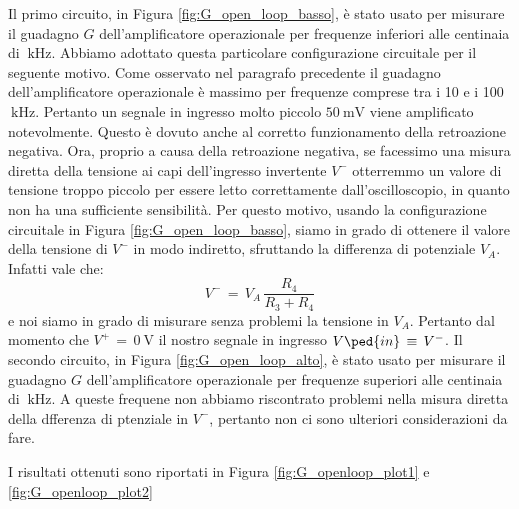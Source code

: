 Il primo circuito, in Figura \ref{fig:G_open_loop_basso}, è stato usato per misurare il guadagno $G$ dell'amplificatore operazionale per frequenze inferiori alle centinaia di $\SI{}{\kilo\hertz}$. Abbiamo adottato questa particolare configurazione circuitale per il seguente motivo. Come osservato nel paragrafo precedente il guadagno dell'amplificatore operazionale è massimo per frequenze comprese tra i 10 e i 100  $\SI{}{\kilo\hertz}$. Pertanto un segnale in ingresso molto piccolo $\SI{50}{\milli\volt}$ viene amplificato notevolmente. Questo è dovuto anche al corretto funzionamento della retroazione negativa. Ora, proprio a causa della retroazione negativa, se facessimo una misura diretta della tensione ai capi dell'ingresso invertente $V^-$ otterremmo un valore di tensione troppo piccolo per essere letto correttamente dall'oscilloscopio, in quanto non ha una sufficiente sensibilità. Per questo motivo, usando la configurazione circuitale in Figura \ref{fig:G_open_loop_basso}, siamo in grado di ottenere il valore della tensione di $V^-$ in modo indiretto, sfruttando la differenza di potenziale $V_A$. Infatti vale che:
\begin{equation*}
        V^-\,=\,V_A\,\frac{R_4}{R_3+R_4}
\end{equation*}
e noi siamo in grado di misurare senza problemi la tensione in $V_A$. Pertanto dal momento che $V^+\,=\,\SI{0}{\volt}$ il nostro segnale in ingresso $V\ped{in}\,\equiv\,V^-$.
Il secondo circuito, in Figura \ref{fig:G_open_loop_alto}, è stato usato per misurare il guadagno $G$ dell'amplificatore operazionale per frequenze superiori alle centinaia di $\SI{}{\kilo\hertz}$. A queste frequene non abbiamo riscontrato problemi nella misura diretta della dfferenza di ptenziale in $V^-$, pertanto non ci sono ulteriori considerazioni da fare.

I risultati ottenuti sono riportati in Figura \ref{fig:G_openloop_plot1} e \ref{fig:G_openloop_plot2}

